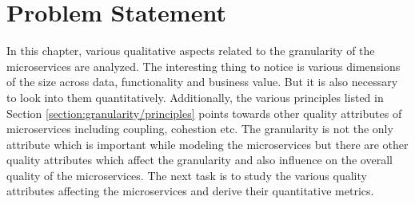 \section{Problem Statement}\label{section:granularity/problem_statement}
In this chapter, various qualitative aspects related to the granularity of the microservices are analyzed. The interesting thing to notice is various dimensions of the size across data, functionality and business value. But it is also necessary to look into them quantitatively. Additionally, the various principles listed in Section \ref{section:granularity/principles} points towards other quality attributes of microservices including coupling, cohestion etc. The granularity is not the only attribute which is important while modeling the microservices but there are other quality attributes which affect the granularity and also influence on the overall quality of the microservices. The next task is to study the various quality attributes affecting the microservices and derive their quantitative metrics.

 
